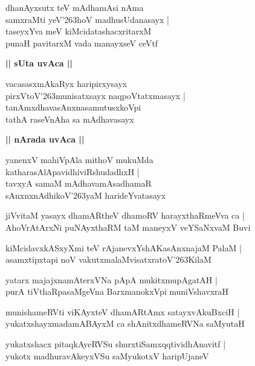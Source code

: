 \documentclass[twoside,12pt,openright]{book}
\def\S{\char'263}
\newcounter{shloka}[chapter]
\def\uvaca#1{\centerline{{\large\textbf{#1}}}}
\begin{document}
\begin{shloka}%
dhanAyxsutx teV mAdhamAsi nAma \\
samxraMti yeV\S hoV madhusUdanasayx |\\
taseyxYva meV kiMcidatashacxritarxM \\
punaH pavitarxM vada manayxseV ceVtf 
\end{shloka}

\uvaca{|| sUta uvAca ||}

\begin{shloka}%
vacasasxmAkaRyx haripirxysayx \\
pirxVtoV\S munisatxsayx naqpoVtatxmasayx |\\
tanAmxdhavasAnxnasamutusxkoVpi \\
tathA raseVnAha sa mAdhavasayx 
\end{shloka}

\uvaca{|| nArada uvAca ||}

\begin{shloka}%
yanenxV mahiVpAla mithoV mukuMda \\
katharasAlApavidhiviRshudadhxH |\\
tavxyA samaM mAdhavamAsadhamaR \\
sAnxnxnAdhikoV\S yaM harideYvatasayx 
\end{shloka}

\begin{shloka}%
jiVvitaM yasayx dhamARtheV dhamoRV harayxthaRmeVva ca |\\
AhoVrAtArxNi puNAyxthaRM taM maneyxV veYSaNxvaM Buvi
\end{shloka}

\begin{shloka}%
kiMcidavxkASxyXmi teV  rAjanevxYshAKasAnxnajaM PalaM |\\
asamxtipxtapi noV vakutxmalaMvisatxratoV\S KilaM 
\end{shloka}

\begin{shloka}%
yatarx majajxnamAterxVNa pApA mukitxmupAgatAH |\\
purA tiVthaRpasaMgeVna BarxmanokxVpi muniVshavxraH 
\end{shloka}

\begin{shloka}%
munishameRVti viKAyxteV dhamARtAmx satayxvAkuBxciH |\\
yukatxshayxmadamABAyxM ca shAnitxdhameRVNa saMyutaH 
\end{shloka}

\begin{shloka}%
yukatxshacx pitaqkAyeRVSu shurxtiSamxqqtividhAnavitf |\\
yukotx madhuravAkeyxVSu saMyukotxV haripUjaneV 
\end{shloka}
\end{document}
